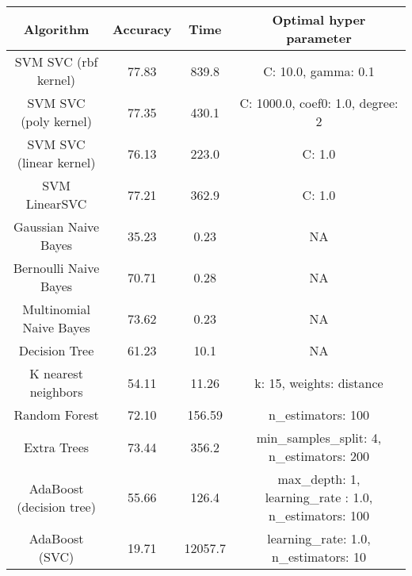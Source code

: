 \begin{center}
	\begin{tabular}{c|c|c|c}
    \hline
	     Algorithm   & Accuracy & Time & Optimal hyper parameter\\
         \hline
         SVM SVC (rbf kernel)   & 77.83  & 839.8 & C: 10.0, gamma: 0.1\\
         \hline
         SVM SVC (poly kernel)  & 77.35  & 430.1 & C: 1000.0, coef0: 1.0, degree: 2\\
         \hline
         SVM SVC (linear kernel)   &  76.13  & 223.0 & C: 1.0\\
         \hline
         SVM LinearSVC    &  77.21   &362.9  & C: 1.0\\
         \hline
         \hline
         Gaussian Naive Bayes & 35.23 & 0.23 & NA \\
         \hline
         Bernoulli Naive Bayes &   70.71    & 0.28  & NA \\
         \hline
         Multinomial Naive Bayes & 73.62 	& 0.23  & NA \\
         \hline
         \hline
         Decision Tree &  61.23 & 10.1 & NA \\
         \hline
         \hline
         K nearest neighbors & 54.11 & 11.26 & k: 15, weights:  distance\\
         \hline
         \hline
         Random Forest & 72.10 & 156.59 & n\_estimators: 100\\
         \hline
         Extra Trees & 73.44 & 356.2 &
         min\_samples\_split: 4,
         n\_estimators: 200 \\
         \hline
         AdaBoost (decision tree) & 55.66 & 126.4 & max\_depth: 1, learning\_rate : 1.0, n\_estimators: 100\\
         \hline
         AdaBoost (SVC) & 19.71 & 12057.7 & learning\_rate: 1.0,
         n\_estimators: 10\\
         \hline
        
          \end{tabular}
\end{center}